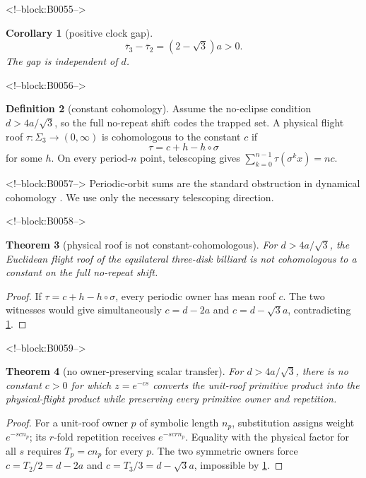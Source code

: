 \documentclass[11pt,a4paper]{article}
\newtheorem{theorem}{Theorem}[section]
\newtheorem{corollary}[theorem]{Corollary}
\theoremstyle{definition}
\newtheorem{definition}[theorem]{Definition}
\theoremstyle{remark}
\begin{document}
<!--block:B0055-->
\begin{corollary}[positive clock gap]\label{cor:gap}
\[
 \overline{\tau}_3-\overline{\tau}_2=(2-\sqrt3)a>0.
\]
The gap is independent of \(d\).
\end{corollary}

<!--block:B0056-->
\begin{definition}[constant cohomology]
Assume the no-eclipse condition \(d>4a/\sqrt3\), so the full no-repeat shift
codes the trapped set.  A physical flight roof
\(\tau:\Sigma_3\to(0,\infty)\) is cohomologous to the constant \(c\) if
\[
 \tau=c+h-h\circ\sigma
\]
for some \(h\). On every period-\(n\) point, telescoping gives
\(\sum_{k=0}^{n-1}\tau(\sigma^kx)=nc\).
\end{definition}

<!--block:B0057-->
Periodic-orbit sums are the standard obstruction in dynamical cohomology \citep[main cohomology criteria]{Livsic1972}. We use only the necessary telescoping direction.

<!--block:B0058-->
\begin{theorem}[physical roof is not constant-cohomologous]\label{thm:noncohom}
For \(d>4a/\sqrt3\), the Euclidean flight roof of the equilateral three-disk
billiard is not cohomologous to a constant on the full no-repeat shift.
\end{theorem}
\begin{proof}
If \(\tau=c+h-h\circ\sigma\), every periodic owner has mean roof \(c\). The two witnesses would give simultaneously \(c=d-2a\) and \(c=d-\sqrt3a\), contradicting \cref{cor:gap}.
\end{proof}

<!--block:B0059-->
\begin{theorem}[no owner-preserving scalar transfer]\label{thm:nontransfer}
For \(d>4a/\sqrt3\), there is no constant \(c>0\) for which \(z=e^{-cs}\)
converts the unit-roof primitive product into the physical-flight product
while preserving every primitive owner and repetition.
\end{theorem}
\begin{proof}
For a unit-roof owner \(p\) of symbolic length \(n_p\), substitution assigns weight \(e^{-scn_p}\); its \(r\)-fold repetition receives \(e^{-scrn_p}\). Equality with the physical factor for all \(s\) requires \(T_p=cn_p\) for every \(p\). The two symmetric owners force \(c=T_2/2=d-2a\) and \(c=T_3/3=d-\sqrt3a\), impossible by \cref{cor:gap}.
\end{proof}
\end{document}
